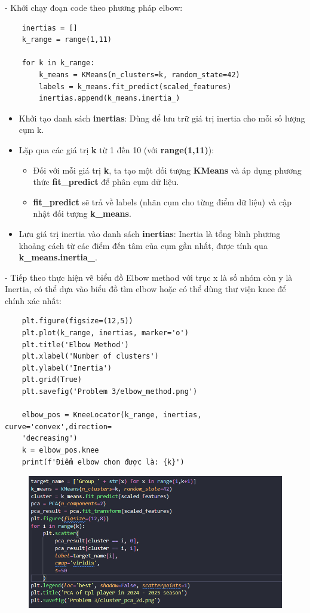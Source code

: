 - Khởi chạy đoạn code theo phương pháp elbow:
\begin{verbatim}
    inertias = []
    k_range = range(1,11)

    for k in k_range:
        k_means = KMeans(n_clusters=k, random_state=42)
        labels = k_means.fit_predict(scaled_features)
        inertias.append(k_means.inertia_)
\end{verbatim}
\begin{itemize}
    \item Khởi tạo danh sách \textbf{inertias}: Dùng để lưu trữ giá trị inertia cho mỗi số
    lượng cụm k.
    \item Lặp qua các giá trị \textbf{k} từ 1 đến 10 (với \textbf{range(1,11)}):
    \begin{itemize}[label=$\circ$]
        \item Đối với mỗi giá trị \textbf{k}, ta tạo một đối tượng \textbf{KMeans} và áp dụng phương thức \textbf{fit\_predict} để phân cụm dữ liệu.
        \item \textbf{fit\_predict} sẽ trả về labels (nhãn cụm cho từng điểm dữ liệu) và cập nhật đối tượng \textbf{k\_means}.
    \end{itemize}
    \item Lưu giá trị inertia vào danh sách \textbf{inertias}: Inertia là tổng bình phương khoảng cách từ các điểm đến tâm của cụm gần nhất, được tính qua \textbf{ k\_means.inertia\_}.
\end{itemize}
- Tiếp theo thực hiện vẽ biểu đồ Elbow method với trục x là số nhóm còn y là Inertia, có thể dựa vào biểu đồ tìm elbow hoặc có thể dùng thư viện knee để chính xác nhất:
\begin{verbatim}
    plt.figure(figsize=(12,5))
    plt.plot(k_range, inertias, marker='o')
    plt.title('Elbow Method')
    plt.xlabel('Number of clusters')
    plt.ylabel('Inertia')
    plt.grid(True)
    plt.savefig('Problem 3/elbow_method.png')
    
    elbow_pos = KneeLocator(k_range, inertias, curve='convex',direction=
    'decreasing')
    k = elbow_pos.knee
    print(f'Điểm elbow chon được là: {k}')
\end{verbatim}
\begin{figure}[H]
    \centering
    \includegraphics[width=1\linewidth]{img/3-2.png}
\end{figure}
